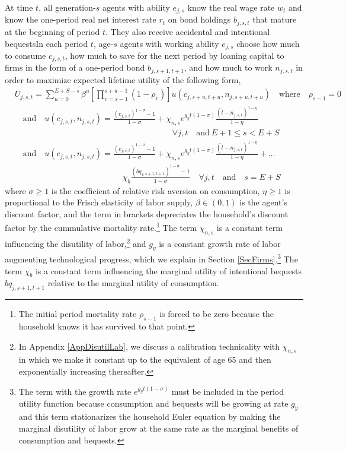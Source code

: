 \documentclass[letterpaper,12pt]{article}
\theoremstyle{definition}
\begin{document}
\begin{spacing}{1.5}
    \noindent At time $t$, all generation-$s$ agents with ability $e_{j,s}$ know the real wage rate $w_t$ and know the one-period real net interest rate $r_t$ on bond holdings $b_{j,s,t}$ that mature at the beginning of period $t$. They also receive accidental and intentional bequestsIn each period $t$, age-$s$ agents with working ability $e_{j,s}$ choose how much to consume $c_{j,s,t}$, how much to save for the next period by loaning capital to firms in the form of a one-period bond $b_{j,s+1,t+1}$, and how much to work $n_{j,s,t}$ in order to maximize expected lifetime utility of the following form,
    \begin{equation}\label{EqUtilMax}
      \begin{split}
        &U_{j,s,t} = \sum_{u=0}^{E+S-s}\beta^u\left[\prod_{v=s-1}^{s+u-1}(1-\rho_v)\right] u\left(c_{j,s+u,t+u},n_{j,s+u,t+u}\right) \quad\text{where}\quad \rho_{s-1}=0 \\
        &\quad\text{and} \quad u\left(c_{j,s,t},n_{j,s,t}\right) = \frac{\left(c_{j,s,t}\right)^{1-\sigma} - 1}{1-\sigma} + \chi_{n,s}e^{g_y t(1-\sigma)}\frac{(\tilde{l}-n_{j,s,t})^{1-\eta}}{1-\eta} \\
        &\quad\quad\quad\quad\quad\quad\quad\quad\quad\quad\quad\quad\quad\quad\quad\quad\quad\quad\quad\forall j,t\quad\text{and}\:E+1\leq s< E+S \\
        &\quad\text{and}\quad u\left(c_{j,s,t},n_{j,s,t}\right) = \frac{\left(c_{j,s,t}\right)^{1-\sigma} - 1}{1-\sigma} + \chi_{n,s}e^{g_y t(1-\sigma)}\frac{(\tilde{l}-n_{j,s,t})^{1-\eta}}{1-\eta} + ... \\
        &\quad\quad\quad\quad\quad\quad\quad\quad\quad\quad\quad\quad\quad \chi_b\frac{\left(bq_{j,s+1,t+1}\right)^{1-\sigma} - 1}{1-\sigma} \quad\forall j,t\quad\text{and}\quad s=E+S
      \end{split}
    \end{equation}
    where $\sigma\geq 1$ is the coefficient of relative risk aversion on consumption, $\eta\geq 1$ is proportional to the Frisch elasticity of labor supply, $\beta\in(0,1)$ is the agent's discount factor, and the term in brackets depreciates the household's discount factor by the cummulative mortality rate.\footnote{The initial period mortality rate $\rho_{s-1}$ is forced to be zero because the household knows it has survived to that point.} The term $\chi_{n,s}$ is a constant term influencing the disutility of labor,\footnote{In Appendix \ref{AppDisutilLab}, we discuss a calibration technicality with $\chi_{n,s}$ in which we make it constant up to the equivalent of age 65 and then exponentially increasing thereafter.} and $g_y$ is a constant growth rate of labor augmenting technological progress, which we explain in Section \ref{SecFirms}.\footnote{The term with the growth rate $e^{g_y t(1-\sigma)}$ must be included in the period utility function because consumption and bequests will be growing at rate $g_y$ and this term stationarizes the household Euler equation by making the marginal disutility of labor grow at the same rate as the marginal benefits of consumption and bequests.} The term $\chi_b$ is a constant term influencing the marginal utility of intentional bequests $bq_{j,s+1,t+1}$ relative to the marginal utility of consumption.


\end{spacing}
\end{document}
